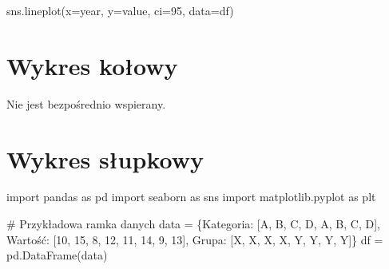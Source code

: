\documentclass[
  polish,
  letterpaper,
  DIV=11,
  numbers=noendperiod]{scrreprt}
\newenvironment{Shaded}{\begin{snugshade}}{\end{snugshade}}
\newcommand{\CommentTok}[1]{\textcolor[rgb]{0.37,0.37,0.37}{#1}}
\newcommand{\DecValTok}[1]{\textcolor[rgb]{0.68,0.00,0.00}{#1}}
\newcommand{\ImportTok}[1]{\textcolor[rgb]{0.00,0.46,0.62}{#1}}
\newcommand{\NormalTok}[1]{\textcolor[rgb]{0.00,0.23,0.31}{#1}}
\newcommand{\OperatorTok}[1]{\textcolor[rgb]{0.37,0.37,0.37}{#1}}
\newcommand{\StringTok}[1]{\textcolor[rgb]{0.13,0.47,0.30}{#1}}
\begin{document}
\begin{Shaded}
\begin{Highlighting}[]
\NormalTok{sns.lineplot(x}\OperatorTok{=}\StringTok{\textquotesingle{}year\textquotesingle{}}\NormalTok{, y}\OperatorTok{=}\StringTok{\textquotesingle{}value\textquotesingle{}}\NormalTok{, ci}\OperatorTok{=}\DecValTok{95}\NormalTok{, data}\OperatorTok{=}\NormalTok{df)}
\end{Highlighting}
\end{Shaded}

\section{Wykres kołowy}\label{wykres-koux142owy}

Nie jest bezpośrednio wspierany.

\section{Wykres słupkowy}\label{wykres-sux142upkowy}

\begin{Shaded}
\begin{Highlighting}[]
\ImportTok{import}\NormalTok{ pandas }\ImportTok{as}\NormalTok{ pd}
\ImportTok{import}\NormalTok{ seaborn }\ImportTok{as}\NormalTok{ sns}
\ImportTok{import}\NormalTok{ matplotlib.pyplot }\ImportTok{as}\NormalTok{ plt}

\CommentTok{\# Przykładowa ramka danych}
\NormalTok{data }\OperatorTok{=}\NormalTok{ \{}\StringTok{\textquotesingle{}Kategoria\textquotesingle{}}\NormalTok{: [}\StringTok{\textquotesingle{}A\textquotesingle{}}\NormalTok{, }\StringTok{\textquotesingle{}B\textquotesingle{}}\NormalTok{, }\StringTok{\textquotesingle{}C\textquotesingle{}}\NormalTok{, }\StringTok{\textquotesingle{}D\textquotesingle{}}\NormalTok{, }\StringTok{\textquotesingle{}A\textquotesingle{}}\NormalTok{, }\StringTok{\textquotesingle{}B\textquotesingle{}}\NormalTok{, }\StringTok{\textquotesingle{}C\textquotesingle{}}\NormalTok{, }\StringTok{\textquotesingle{}D\textquotesingle{}}\NormalTok{],}
        \StringTok{\textquotesingle{}Wartość\textquotesingle{}}\NormalTok{: [}\DecValTok{10}\NormalTok{, }\DecValTok{15}\NormalTok{, }\DecValTok{8}\NormalTok{, }\DecValTok{12}\NormalTok{, }\DecValTok{11}\NormalTok{, }\DecValTok{14}\NormalTok{, }\DecValTok{9}\NormalTok{, }\DecValTok{13}\NormalTok{],}
        \StringTok{\textquotesingle{}Grupa\textquotesingle{}}\NormalTok{: [}\StringTok{\textquotesingle{}X\textquotesingle{}}\NormalTok{, }\StringTok{\textquotesingle{}X\textquotesingle{}}\NormalTok{, }\StringTok{\textquotesingle{}X\textquotesingle{}}\NormalTok{, }\StringTok{\textquotesingle{}X\textquotesingle{}}\NormalTok{, }\StringTok{\textquotesingle{}Y\textquotesingle{}}\NormalTok{, }\StringTok{\textquotesingle{}Y\textquotesingle{}}\NormalTok{, }\StringTok{\textquotesingle{}Y\textquotesingle{}}\NormalTok{, }\StringTok{\textquotesingle{}Y\textquotesingle{}}\NormalTok{]\}}
\NormalTok{df }\OperatorTok{=}\NormalTok{ pd.DataFrame(data)}
\end{Highlighting}
\end{Shaded}
\end{document}
